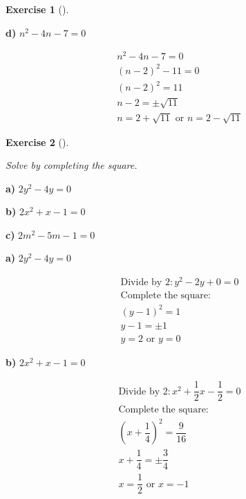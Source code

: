 \documentclass[
  letterpaper,
  DIV=11,
  numbers=noendperiod]{scrreprt}
\theoremstyle{definition}
\newtheorem{exercise}{Exercise}[chapter]
\theoremstyle{remark}
\begin{document}
\begin{exercise}[]
\begin{tcolorbox}
\textbf{d)} \(\displaystyle n^2 - 4n - 7 = 0\)

\begin{align*}
n^2 - 4n - 7 = 0 \\ (n - 2)^2 - 11 = 0 \\ (n - 2)^2 = 11 \\ n - 2 = \pm \sqrt{11} \\ n = 2 + \sqrt{11} \text{ or } n = 2 - \sqrt{11}
\end{align*}

\end{tcolorbox}

\end{exercise}

\begin{exercise}[]\protect\hypertarget{exr-u6-17}{}\label{exr-u6-17}

\emph{Solve by completing the square.}

\textbf{a)} \(\displaystyle 2y^2 - 4y = 0\)

\textbf{b)} \(\displaystyle 2x^2 + x - 1 = 0\)

\textbf{c)} \(\displaystyle 2m^2 - 5m - 1 = 0\)

\begin{tcolorbox}[enhanced jigsaw, opacitybacktitle=0.6, coltitle=black, arc=.35mm, colframe=quarto-callout-tip-color-frame, colback=white, bottomrule=.15mm, left=2mm, colbacktitle=quarto-callout-tip-color!10!white, titlerule=0mm, opacityback=0, title=\textcolor{quarto-callout-tip-color}{\faLightbulb}\hspace{0.5em}{🔍 View Solutions}, leftrule=.75mm, breakable, rightrule=.15mm, bottomtitle=1mm, toptitle=1mm, toprule=.15mm]

\textbf{a)} \(\displaystyle 2y^2 - 4y = 0\)

\begin{align*}
\text{Divide by } 2: y^2 -2y +0 = 0 \\ \text{Complete the square:} \\ \left(y - 1\right)^2 = 1 \\ y - 1 = \pm 1 \\ y = 2 \text{ or } y = 0
\end{align*}

\textbf{b)} \(\displaystyle 2x^2 + x - 1 = 0\)

\begin{align*}
\text{Divide by } 2: x^2 +\dfrac{1}{2}x -\dfrac{1}{2} = 0 \\ \text{Complete the square:} \\ \left(x + \dfrac{1}{4}\right)^2 = \dfrac{9}{16} \\ x + \dfrac{1}{4} = \pm \dfrac{3}{4} \\ x = \dfrac{1}{2} \text{ or } x = -1
\end{align*}


\end{tcolorbox}
\end{exercise}
\end{document}
